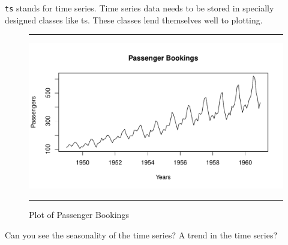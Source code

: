 \documentclass[11pt, letterpaper, twoside]{memoir}\usepackage{knitr}
\begin{document}
\texttt{ts} stands for time series. Time series data needs to be stored in specially designed classes like ts. These classes lend themselves well to plotting.

\begin{figure}
\centering
\rule{4in}{1pt}
\begin{knitrout}
\color{fgcolor}\begin{kframe}
\begin{alltt}
 \hlstd{=}\hlstd{,} \hlstd{=}\hlstd{,}
     \hlstd{=}\hlstd{)}
\end{alltt}
\end{kframe}
\includegraphics[width=\maxwidth]{figure/unnamed-chunk-102-1} 

\end{knitrout}
\caption{Plot of Passenger Bookings}
\label{Fig:passbook }
\rule{4in}{1pt}
\end{figure}

Can you see the seasonality of the time series? A trend in the time series?
\end{document}
